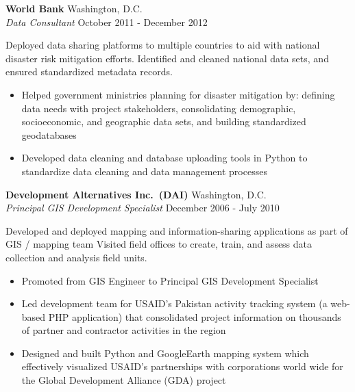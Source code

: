 \documentclass[letterpaper]{article}
\newif\ifDATACV
\newif\ifGISCV
\begin{document}
\textbf{World Bank} 
    \hfill Washington, D.C.\\
\textit{Data Consultant} 
    \hfill October 2011 - December 2012\\
\vspace{1mm}

Deployed data sharing platforms to multiple countries to aid with national
disaster risk mitigation efforts. Identified and cleaned national data sets, 
and ensured standardized metadata records.
\vspace{-1mm}
\begin{itemize} \itemsep 0pt
    \item Helped government ministries planning for disaster mitigation by:
    defining data needs with project stakeholders, consolidating demographic,
    socioeconomic, and geographic data sets, and building standardized
    geodatabases
    
    \item Developed data cleaning and database uploading tools in Python to 
    standardize data cleaning and data management processes
\end{itemize}


\textbf{Development Alternatives Inc.~(DAI)} 
    \hfill Washington, D.C.\\
\ifDATACV
    \textit{Principal Development Specialist} 
\else \ifGISCV
    \textit{Principal GIS Development Specialist} 
\fi \fi
    \hfill December 2006 - July 2010\\
\vspace{1mm}

Developed and deployed mapping and information-sharing applications as part of
    \ifDATACV
        data team.  
    \else \ifGISCV
        GIS / mapping team
    \fi \fi
Visited field offices to create, train, and assess data collection and analysis
field units.
\vspace{-1mm}
\begin{itemize} \itemsep 1pt
    \ifDATACV
        \item Promoted from Data Engineer to Principal Development Specialist
    \else \ifGISCV
        \item Promoted from GIS Engineer to Principal GIS Development Specialist
    \fi \fi

    \item Led development team for USAID's Pakistan activity tracking system (a
    web-based PHP application) that consolidated project information on
    thousands of partner and contractor activities in the region

    \item Designed and built Python and GoogleEarth mapping system which
    effectively visualized USAID's partnerships with corporations world wide for
    the Global Development Alliance (GDA) project


\end{itemize}
\vspace{1mm}
\end{document}
